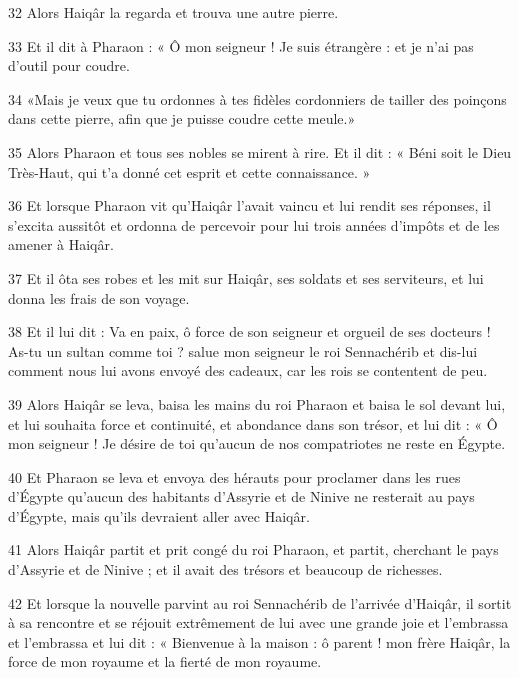 \par 32 Alors Haiqâr la regarda et trouva une autre pierre.

\par 33 Et il dit à Pharaon : « Ô mon seigneur ! Je suis étrangère : et je n'ai pas d'outil pour coudre.

\par 34 «Mais je veux que tu ordonnes à tes fidèles cordonniers de tailler des poinçons dans cette pierre, afin que je puisse coudre cette meule.»

\par 35 Alors Pharaon et tous ses nobles se mirent à rire. Et il dit : « Béni soit le Dieu Très-Haut, qui t'a donné cet esprit et cette connaissance. »

\par 36 Et lorsque Pharaon vit qu'Haiqâr l'avait vaincu et lui rendit ses réponses, il s'excita aussitôt et ordonna de percevoir pour lui trois années d'impôts et de les amener à Haiqâr.

\par 37 Et il ôta ses robes et les mit sur Haiqâr, ses soldats et ses serviteurs, et lui donna les frais de son voyage.

\par 38 Et il lui dit : Va en paix, ô force de son seigneur et orgueil de ses docteurs ! As-tu un sultan comme toi ? salue mon seigneur le roi Sennachérib et dis-lui comment nous lui avons envoyé des cadeaux, car les rois se contentent de peu.

\par 39 Alors Haiqâr se leva, baisa les mains du roi Pharaon et baisa le sol devant lui, et lui souhaita force et continuité, et abondance dans son trésor, et lui dit : « Ô mon seigneur ! Je désire de toi qu'aucun de nos compatriotes ne reste en Égypte.

\par 40 Et Pharaon se leva et envoya des hérauts pour proclamer dans les rues d'Égypte qu'aucun des habitants d'Assyrie et de Ninive ne resterait au pays d'Égypte, mais qu'ils devraient aller avec Haiqâr.

\par 41 Alors Haiqâr partit et prit congé du roi Pharaon, et partit, cherchant le pays d'Assyrie et de Ninive ; et il avait des trésors et beaucoup de richesses.

\par 42 Et lorsque la nouvelle parvint au roi Sennachérib de l'arrivée d'Haiqâr, il sortit à sa rencontre et se réjouit extrêmement de lui avec une grande joie et l'embrassa et l'embrassa et lui dit : « Bienvenue à la maison : ô parent ! mon frère Haiqâr, la force de mon royaume et la fierté de mon royaume.


